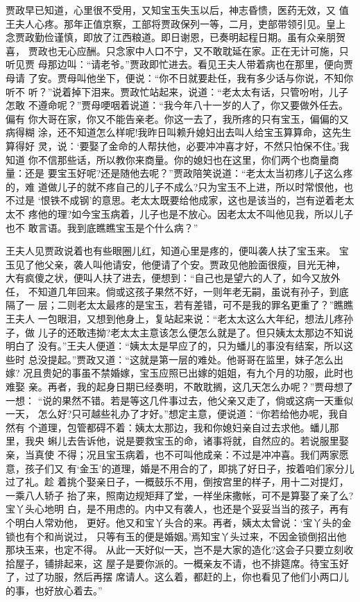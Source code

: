 贾政早已知道，心里很不受用，又知宝玉失玉以后，神志昏愦，医药无效，又
值王夫人心疼。那年正值京察，工部将贾政保列一等，二月，吏部带领引见。皇上
念贾政勤俭谨慎，即放了江西粮道。即日谢恩，已奏明起程日期。虽有众亲朋贺喜，
贾政也无心应酬。只念家中人口不宁，又不敢耽延在家。正在无计可施，只听见贾
母那边叫：“请老爷。”贾政即忙进去。看见王夫人带着病也在那里，便向贾母请
了安。贾母叫他坐下，便说：“你不日就要赴任，我有多少话与你说，不知你听不
听？”说着掉下泪来。贾政忙站起来，说道：“老太太有话，只管吩咐，儿子怎敢
不遵命呢？”贾母哽咽着说道：“我今年八十一岁的人了，你又要做外任去。偏有
你大哥在家，你又不能告亲老。你这一去了，我所疼的只有宝玉，偏偏的又病得糊
涂，还不知道怎么样呢!我昨日叫赖升媳妇出去叫人给宝玉算算命，这先生算得好
灵，说：‘要娶了金命的人帮扶他，必要冲冲喜才好，不然只怕保不住。’我知道
你不信那些话，所以教你来商量。你的媳妇也在这里，你们两个也商量商量：还是
要宝玉好呢?还是随他去呢？”贾政陪笑说道：“老太太当初疼儿子这么疼的，难
道做儿子的就不疼自己的儿子不成么?只为宝玉不上进，所以时常恨他，也不过是
‘恨铁不成钢’的意思。老太太既要给他成家，这也是该当的，岂有逆着老太太不
疼他的理?如今宝玉病着，儿子也是不放心。因老太太不叫他见我，所以儿子也不
敢言语。我到底瞧瞧宝玉是个什么病？”

王夫人见贾政说着也有些眼圈儿红，知道心里是疼的，便叫袭人扶了宝玉来。
宝玉见了他父亲，袭人叫他请安，他便请了个安。贾政见他脸面很瘦，目光无神，
大有疯傻之状，便叫人扶了进去，便想到：“自己也是望六的人了，如今又放外任，
不知道几年回来。倘或这孩子果然不好，一则年老无嗣，虽说有孙子，到底隔了一
层；二则老太太最疼的是宝玉，若有差错，可不是我的罪名更重了？”瞧瞧王夫人
一包眼泪，又想到他身上，复站起来说：“老太太这么大年纪，想法儿疼孙子，做
儿子的还敢违拗?老太太主意该怎么便怎么就是了。但只姨太太那边不知说明白了
没有。”王夫人便道：“姨太太是早应了的，只为蟠儿的事没有结案，所以这些时
总没提起。”贾政又道：“这就是第一层的难处。他哥哥在监里，妹子怎么出嫁?
况且贵妃的事虽不禁婚嫁，宝玉应照已出嫁的姐姐，有九个月的功服，此时也难娶
亲。再者，我的起身日期已经奏明，不敢耽搁，这几天怎么办呢？”贾母想了一想：
“说的果然不错。若是等这几件事过去，他父亲又走了，倘或这病一天重似一天，
怎么好?只可越些礼办了才好。”想定主意，便说道：“你若给他办呢，我自然有
个道理，包管都碍不着：姨太太那边，我和你媳妇亲自过去求他。蟠儿那里，我央
蝌儿去告诉他，说是要救宝玉的命，诸事将就，自然应的。若说服里娶亲，当真使
不得；况且宝玉病着，也不可叫他成亲：不过是冲冲喜。我们两家愿意，孩子们又
有‘金玉’的道理，婚是不用合的了，即挑了好日子，按着咱们家分儿过了礼。趁
着挑个娶亲日子，一概鼓乐不用，倒按宫里的样子，用十二对提灯，一乘八人轿子
抬了来，照南边规矩拜了堂，一样坐床撒帐，可不是算娶了亲了么?宝丫头心地明
白，是不用虑的。内中又有袭人，也还是个妥妥当当的孩子，再有个明白人常劝他，
更好。他又和宝丫头合的来。再者，姨太太曾说：‘宝丫头的金锁也有个和尚说过，
只等有玉的便是婚姻。’焉知宝丫头过来，不因金锁倒招出他那块玉来，也定不得。
从此一天好似一天，岂不是大家的造化?这会子只要立刻收拾屋子，铺排起来，这
屋子是要你派的。一概亲友不请，也不排筵席。待宝玉好了，过了功服，然后再摆
席请人。这么着，都赶的上，你也看见了他们小两口儿的事，也好放心着去。”

